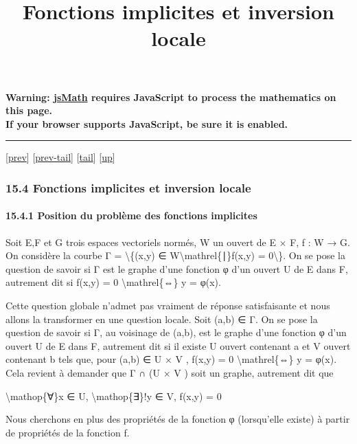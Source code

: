 \documentclass[]{article}
\title{Fonctions implicites et inversion locale}
\author{}
\date{}
\begin{document}
\maketitle

\textbf{Warning: \href{http://www.math.union.edu/locate/jsMath}{jsMath}
requires JavaScript to process the mathematics on this page.\\ If your
browser supports JavaScript, be sure it is enabled.}

\begin{center}\rule{3in}{0.4pt}\end{center}

{[}\href{coursse84.html}{prev}{]}
{[}\href{coursse84.html\#tailcoursse84.html}{prev-tail}{]}
{[}\hyperref[tailcoursse85.html]{tail}{]}
{[}\href{coursch16.html\#coursse85.html}{up}{]}

\subsubsection{15.4 Fonctions implicites et inversion locale}

\paragraph{15.4.1 Position du problème des fonctions implicites}

Soit E,F et G trois espaces vectoriels normés, W un ouvert de E × F, f :
W → G. On considère la courbe Γ = \textbackslash{}\{(x,y) ∈
W\textbackslash{}mathrel\{∣\}f(x,y) = 0\textbackslash{}\}. On se pose la
question de savoir si Γ est le graphe d'une fonction φ d'un ouvert U de
E dans F, autrement dit si f(x,y) = 0 \textbackslash{}mathrel\{⇔\} y =
φ(x).

Cette question globale n'admet pas vraiment de réponse satisfaisante et
nous allons la transformer en une question locale. Soit (a,b) ∈ Γ. On se
pose la question de savoir si Γ, au voisinage de (a,b), est le graphe
d'une fonction φ d'un ouvert U de E dans F, autrement dit si il existe U
ouvert contenant a et V ouvert contenant b tels que, pour (a,b) ∈ U × V
, f(x,y) = 0 \textbackslash{}mathrel\{⇔\} y = φ(x). Cela revient à
demander que Γ ∩ (U × V ) soit un graphe, autrement dit que

\textbackslash{}mathop\{∀\}x ∈ U, \textbackslash{}mathop\{∃\}!y ∈ V,
f(x,y) = 0

Nous cherchons en plus des propriétés de la fonction φ (lorsqu'elle
existe) à partir de propriétés de la fonction f.
\end{document}
